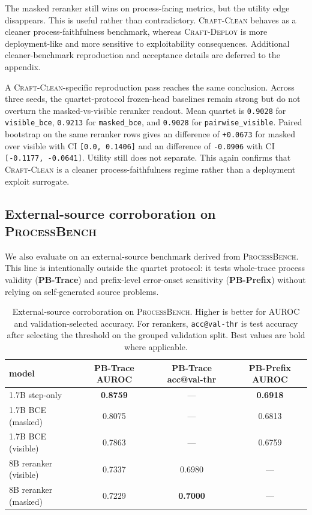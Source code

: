 The masked reranker still wins on process-facing metrics, but the utility edge
disappears. This is useful rather than contradictory. \textsc{Craft-Clean}
behaves as a cleaner process-faithfulness benchmark, whereas
\textsc{Craft-Deploy} is more deployment-like and more sensitive to
exploitability consequences. Additional cleaner-benchmark reproduction and
acceptance details are deferred to the appendix.

A \textsc{Craft-Clean}-specific reproduction pass reaches the same conclusion.
Across three seeds, the quartet-protocol frozen-head baselines remain strong
but do not overturn the masked-vs-visible reranker readout. Mean quartet
\amcd{} is \texttt{0.9028} for \texttt{visible\_bce}, \texttt{0.9213} for
\texttt{masked\_bce}, and \texttt{0.9028} for \texttt{pairwise\_visible}.
Paired bootstrap on the same reranker rows gives an \amcd{} difference of
\texttt{+0.0673} for masked over visible with CI \texttt{[0.0, 0.1406]} and an
\asstotal{} difference of \texttt{-0.0906} with CI
\texttt{[-0.1177, -0.0641]}. Utility still does not separate. This again
confirms that \textsc{Craft-Clean} is a cleaner process-faithfulness regime
rather than a deployment exploit surrogate.

\subsection{External-source corroboration on \textsc{ProcessBench}}

We also evaluate on an external-source benchmark derived from
\textsc{ProcessBench}. This line is intentionally outside the quartet
protocol: it tests whole-trace process validity (\textbf{PB-Trace}) and
prefix-level error-onset sensitivity (\textbf{PB-Prefix}) without relying on
self-generated source problems.

\begin{table}[t]
\centering
\caption{External-source corroboration on \textsc{ProcessBench}. Higher is
better for AUROC and validation-selected accuracy. For rerankers,
\texttt{acc@val-thr} is test accuracy after selecting the threshold on the
grouped validation split. Best values are bold where applicable.}
\label{tab:processbench}
\small
\begin{tabular}{lccc}
\toprule
model & PB-Trace AUROC & PB-Trace acc@val-thr & PB-Prefix AUROC \\
\midrule
1.7B step-only & \textbf{0.8759} & --- & \textbf{0.6918} \\
1.7B BCE (masked) & 0.8075 & --- & 0.6813 \\
1.7B BCE (visible) & 0.7863 & --- & 0.6759 \\
8B reranker (visible) & 0.7337 & 0.6980 & --- \\
8B reranker (masked) & 0.7229 & \textbf{0.7000} & --- \\
\bottomrule
\end{tabular}
\end{table}


